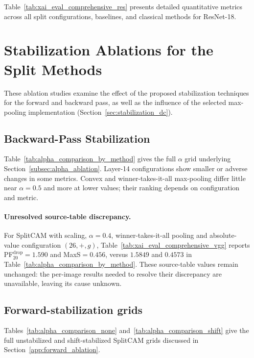 Table~\ref{tab:xai_eval_comprehensive_res} presents detailed quantitative metrics across all split configurations, baselines, and classical methods for ResNet-18.



\section{Stabilization Ablations for the Split Methods}\label{app:ablation}

These ablation studies examine the effect of the proposed stabilization techniques for the forward and backward pass, as well as the influence of the selected max-pooling implementation (Section~\ref{sec:stabilization_dc}).

\subsection{Backward-Pass Stabilization}\label{app:backward_ablation}

Table~\ref{tab:alpha_comparison_by_method} gives the full $\alpha$ grid underlying Section~\ref{subsec:alpha_ablation}. Layer-14 configurations show smaller or adverse changes in some metrics. Convex and winner-takes-it-all max-pooling differ little near $\alpha=0.5$ and more at lower values; their ranking depends on configuration and metric.

\paragraph{Unresolved source-table discrepancy.}
For SplitCAM with scaling, $\alpha=0.4$, winner-takes-it-all pooling and absolute-value configuration $(26,+,g)$, Table~\ref{tab:xai_eval_comprehensive_vgg} reports PF$^{\mathrm{drop}}_{20}=1.590$ and MaxS$=0.456$, versus $1.5849$ and $0.4573$ in Table~\ref{tab:alpha_comparison_by_method}. These source-table values remain unchanged: the per-image results needed to resolve their discrepancy are unavailable, leaving its cause unknown.



\subsection{Forward-stabilization grids}

Tables~\ref{tab:alpha_comparison_none} and~\ref{tab:alpha_comparison_shift} give the full unstabilized and shift-stabilized SplitCAM grids discussed in Section~\ref{app:forward_ablation}.

